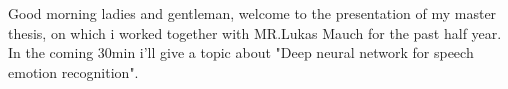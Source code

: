 %

\newcommand{\presenter}{LONGPRESENTERNAME}
\newcommand{\presentershort}{SHORTPRESENTERNAME}
\newcommand{\presenteremail}{PRESENTERMAIL} 		%

\newcommand{\presentationtitle}{TITLE}
\newcommand{\shortpresentationtitle}{TITLEshortBOTTOM}

\newcommand{\presentationtype}{SUBTITLE}

\newcommand{\presentationdate}{MM.DD.YYYY}

\newcommand{\lang}{german}

\newcommand{\handoutmode}{true}


\usepackage{graphicx}
\usepackage{setspace}
\usepackage{tikz}
\usepackage{booktabs}
\usetikzlibrary{calc}
\def\layersep{2.5cm}
\def\layersept{5cm}



\begin{frame}
 Good morning ladies and gentleman, welcome to the presentation of my master thesis, on which i worked together with MR.Lukas Mauch for the past half year. In the coming 30min i'll give a topic about "Deep neural network for speech emotion recognition". 
\end{frame}

